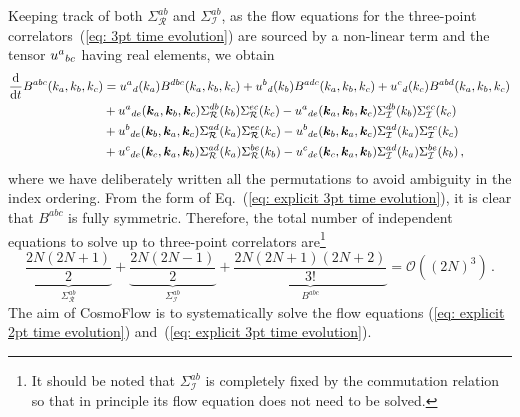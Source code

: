 \documentclass[11pt]{article}
\numberwithin{equation}{section} %
\def \d {\mathrm{d}}
\def \Re {\mathcal{R}}
\def \Im {\mathcal{I}}
\begin{document}
Keeping track of both $\Sigma_{\Re}^{ab}$ and $\Sigma_{\Im}^{ab}$, as the flow equations for the three-point correlators~(\ref{eq: 3pt time evolution}) are sourced by a non-linear term and the tensor $\tensor{u}{^{a}}{_{bc}}$ having real elements, we obtain
\begin{gather}
\label{eq: explicit 3pt time evolution}
    \begin{aligned}
    \frac{\d}{\d t} B^{abc}(k_a, k_b, k_c) &= \tensor{u}{^a}{_d}(k_a)B^{dbc}(k_a, k_b, k_c) + \tensor{u}{^b}{_d}(k_b)B^{adc}(k_a, k_b, k_c) + \tensor{u}{^c}{_d}(k_c)B^{abd}(k_a, k_b, k_c) \\
    &+ \tensor{u}{^a}{_{de}}(\bm{k}_a, \bm{k}_b, \bm{k}_c)\Sigma_{\Re}^{db}(k_b)\Sigma_{\Re}^{ec}(k_c) - \tensor{u}{^a}{_{de}}(\bm{k}_a, \bm{k}_b, \bm{k}_c)\Sigma_{\Im}^{db}(k_b)\Sigma_{\Im}^{ec}(k_c) \\
    &+ \tensor{u}{^b}{_{de}}(\bm{k}_b, \bm{k}_a, \bm{k}_c)\Sigma_{\Re}^{ad}(k_a)\Sigma_{\Re}^{ec}(k_c) - \tensor{u}{^b}{_{de}}(\bm{k}_b, \bm{k}_a, \bm{k}_c)\Sigma_{\Im}^{ad}(k_a)\Sigma_{\Im}^{ec}(k_c) \\
    &+ \tensor{u}{^c}{_{de}}(\bm{k}_c, \bm{k}_a, \bm{k}_b)\Sigma_{\Re}^{ad}(k_a)\Sigma_{\Re}^{be}(k_b) - \tensor{u}{^c}{_{de}}(\bm{k}_c, \bm{k}_a, \bm{k}_b)\Sigma_{\Im}^{ad}(k_a)\Sigma_{\Im}^{be}(k_b)\,,
    \end{aligned}
\raisetag{35pt}
\end{gather}
where we have deliberately written all the permutations to avoid ambiguity in the index ordering. From the form of Eq.~(\ref{eq: explicit 3pt time evolution}), it is clear that $B^{abc}$ is fully symmetric. Therefore, the total number of independent equations to solve up to three-point correlators are\footnote{It should be noted that $\Sigma^{ab}_\Im$ is completely fixed by the commutation relation so that in principle its flow equation does not need to be solved.}
\begin{equation}
    \underbrace{\frac{2N(2N+1)}{2}}_{\Sigma^{ab}_\Re} + \underbrace{\frac{2N(2N-1)}{2}}_{\Sigma^{ab}_\Im} + \underbrace{\frac{2N(2N+1)(2N+2)}{3!}}_{B^{abc}} = \mathcal{O}((2N)^3)\,.
\end{equation}
The aim of \textsf{CosmoFlow} is to systematically solve the flow equations (\ref{eq: explicit 2pt time evolution}) and~(\ref{eq: explicit 3pt time evolution}). 
\end{document}
